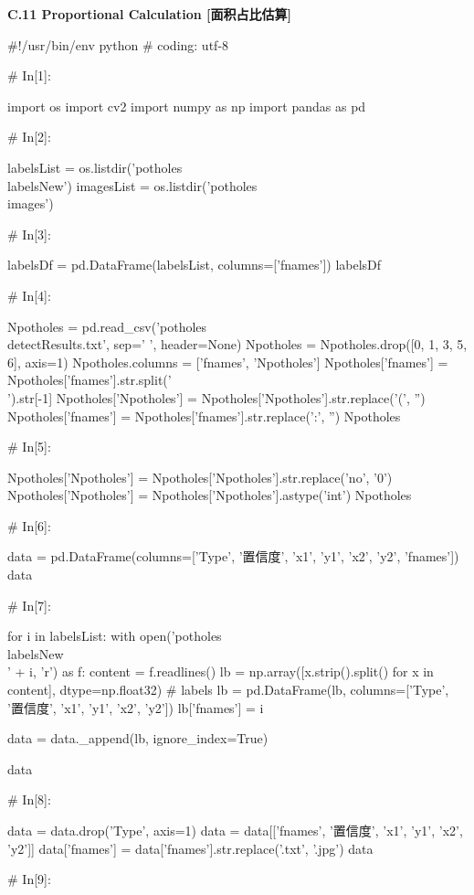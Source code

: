 \documentclass{MathorCupmodeling}
\begin{document}
\textbf{C.11 Proportional Calculation [面积占比估算]}
\begin{python}
#!/usr/bin/env python
# coding: utf-8

# In[1]:


import os
import cv2
import numpy as np
import pandas as pd

# In[2]:


labelsList = os.listdir('potholes\\labelsNew')
imagesList = os.listdir('potholes\\images')

# In[3]:


labelsDf = pd.DataFrame(labelsList, columns=['fnames'])
labelsDf

# In[4]:


Npotholes = pd.read_csv('potholes\\detectResults.txt', sep=' ', header=None)
Npotholes = Npotholes.drop([0, 1, 3, 5, 6], axis=1)
Npotholes.columns = ['fnames', 'Npotholes']
Npotholes['fnames'] = Npotholes['fnames'].str.split('\\').str[-1]
Npotholes['Npotholes'] = Npotholes['Npotholes'].str.replace('(', '')
Npotholes['fnames'] = Npotholes['fnames'].str.replace(':', '')
Npotholes

# In[5]:


Npotholes['Npotholes'] = Npotholes['Npotholes'].str.replace('no', '0')
Npotholes['Npotholes'] = Npotholes['Npotholes'].astype('int')
Npotholes

# In[6]:


data = pd.DataFrame(columns=['Type', '置信度', 'x1', 'y1', 'x2', 'y2', 'fnames'])
data

# In[7]:


for i in labelsList:
    with open('potholes\\labelsNew\\' + i, 'r') as f:
        content = f.readlines()
        lb = np.array([x.strip().split() for x in content], dtype=np.float32)  # labels
        lb = pd.DataFrame(lb, columns=['Type', '置信度', 'x1', 'y1', 'x2', 'y2'])
        lb['fnames'] = i

    data = data._append(lb, ignore_index=True)

data

# In[8]:


data = data.drop('Type', axis=1)
data = data[['fnames', '置信度', 'x1', 'y1', 'x2', 'y2']]
data['fnames'] = data['fnames'].str.replace('.txt', '.jpg')
data

# In[9]:



\end{python}
\end{document}
